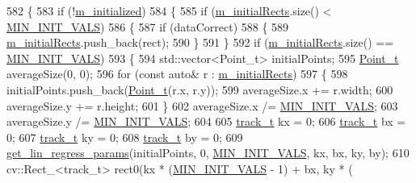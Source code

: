 \begin{DoxyCode}
582 \{
583     \textcolor{keywordflow}{if} (!\mbox{\hyperlink{class_t_kalman_filter_a5633e302e878261c8669816695f6a314}{m\_initialized}})
584     \{
585         \textcolor{keywordflow}{if} (\mbox{\hyperlink{class_t_kalman_filter_a76f15da72d3613b8ba41a9eb38faaeac}{m\_initialRects}}.size() < \mbox{\hyperlink{class_t_kalman_filter_a4511a3b64d2232e516b396e8783220cf}{MIN\_INIT\_VALS}})
586         \{
587             \textcolor{keywordflow}{if} (dataCorrect)
588             \{
589                 \mbox{\hyperlink{class_t_kalman_filter_a76f15da72d3613b8ba41a9eb38faaeac}{m\_initialRects}}.push\_back(rect);
590             \}
591         \}
592         \textcolor{keywordflow}{if} (\mbox{\hyperlink{class_t_kalman_filter_a76f15da72d3613b8ba41a9eb38faaeac}{m\_initialRects}}.size() == \mbox{\hyperlink{class_t_kalman_filter_a4511a3b64d2232e516b396e8783220cf}{MIN\_INIT\_VALS}})
593         \{
594             std::vector<Point\_t> initialPoints;
595             \mbox{\hyperlink{defines_8h_a8c42696da8f098b91374a8e8bb84b430}{Point\_t}} averageSize(0, 0);
596             \textcolor{keywordflow}{for} (\textcolor{keyword}{const} \textcolor{keyword}{auto}& r : \mbox{\hyperlink{class_t_kalman_filter_a76f15da72d3613b8ba41a9eb38faaeac}{m\_initialRects}})
597             \{
598                 initialPoints.push\_back(\mbox{\hyperlink{defines_8h_a8c42696da8f098b91374a8e8bb84b430}{Point\_t}}(r.x, r.y));
599                 averageSize.x += r.width;
600                 averageSize.y += r.height;
601             \}
602             averageSize.x /= \mbox{\hyperlink{class_t_kalman_filter_a4511a3b64d2232e516b396e8783220cf}{MIN\_INIT\_VALS}};
603             averageSize.y /= \mbox{\hyperlink{class_t_kalman_filter_a4511a3b64d2232e516b396e8783220cf}{MIN\_INIT\_VALS}};
604 
605             \mbox{\hyperlink{defines_8h_a7ce9c8817b42ab418e61756f579549ab}{track\_t}} kx = 0;
606             \mbox{\hyperlink{defines_8h_a7ce9c8817b42ab418e61756f579549ab}{track\_t}} bx = 0;
607             \mbox{\hyperlink{defines_8h_a7ce9c8817b42ab418e61756f579549ab}{track\_t}} ky = 0;
608             \mbox{\hyperlink{defines_8h_a7ce9c8817b42ab418e61756f579549ab}{track\_t}} by = 0;
609             \mbox{\hyperlink{_kalman_8h_a956aedf9af504c89aa2ca585a168dc47}{get\_lin\_regress\_params}}(initialPoints, 0, 
      \mbox{\hyperlink{class_t_kalman_filter_a4511a3b64d2232e516b396e8783220cf}{MIN\_INIT\_VALS}}, kx, bx, ky, by);
610             cv::Rect\_<track\_t> rect0(kx * (\mbox{\hyperlink{class_t_kalman_filter_a4511a3b64d2232e516b396e8783220cf}{MIN\_INIT\_VALS}} - 1) + bx, ky * (

\end{DoxyCode}
